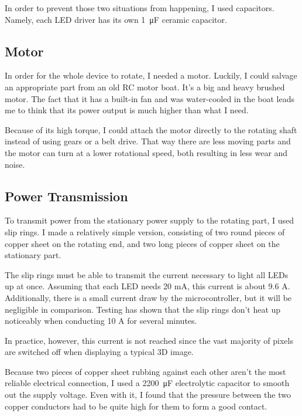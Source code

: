 \documentclass[a4paper, 11pt, titlepage]{report}
\begin{document}
In order to prevent those two situations from happening, I used capacitors. Namely, each LED 
driver has its own \SI{1}{\micro\farad}  ceramic capacitor.



\subsection{Motor}

In order for the whole device to rotate, I needed a motor. Luckily, I could salvage an appropriate
part from an old RC motor boat. It's a big and heavy brushed motor. The fact that it has a built-in
fan and was water-cooled in the boat leads me to think that its power output is much higher than 
what I need.

Because of its high torque, I could attach the motor directly to the rotating shaft instead of 
using gears or a belt drive. That way there are less moving parts and the motor can turn at a lower
rotational speed, both resulting in less wear and noise. 



\subsection{Power Transmission}

To transmit power from the stationary power supply to the rotating part, I used slip rings. I made
a relatively simple version, consisting of two round pieces of copper sheet on the rotating end, 
and two long pieces of copper sheet on the stationary part.

The slip rings must be able to transmit the current necessary to light all LEDs up at once.
Assuming that each LED needs 20 mA, this current is about 9.6 A. Additionally, there is a small 
current draw by the microcontroller, but it will be negligible in comparison. Testing has shown 
that the slip rings don't heat up noticeably when conducting 10 A for several minutes.

In practice, however, this current is not reached since the vast majority of pixels are 
switched off when displaying a typical 3D image. 

Because two pieces of copper sheet rubbing against each other aren't the most reliable electrical 
connection, I used a \SI{2200}{\micro\farad} electrolytic capacitor to smooth out the supply 
voltage. Even with it, I found that the pressure between the two copper conductors had to be quite
high for them to form a good contact.
\end{document}
